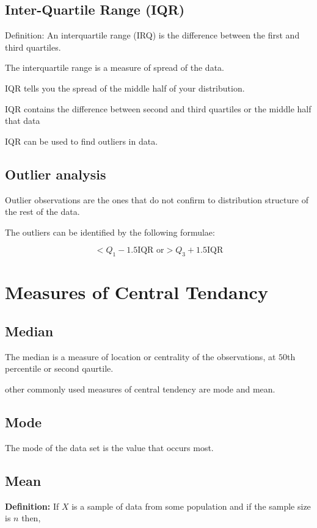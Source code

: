 \documentclass[12pt]{article}
\begin{document}
\subsection{Inter-Quartile Range (IQR)}
Definition: An interquartile range (IRQ) is the difference between the first and third quartiles.

The interquartile range is a measure of spread of the data.

IQR tells you the spread of the middle half of your distribution.

IQR contains the {difference between} second and third quartiles  or the middle half that data

IQR can be used to find outliers in data.

\subsection{Outlier analysis}

Outlier observations are the ones that do not confirm to distribution structure of the rest of the data.

The outliers can be identified by the following formulae:

\begin{equation}
    < Q_1 - 1.5\text{IQR or} > Q_3 + 1.5\text{IQR}
\end{equation}


\section{Measures of Central Tendancy}

\subsection{Median}
The median is a measure of location or centrality of the observations, at $50$th percentile or second qaurtile.

other commonly used measures of central tendency are mode and mean.
\subsection{Mode}
The mode of the data set is the value that occurs most.
\subsection{Mean}

\textbf{Definition: }If $X$ is a sample of data from some population and if the sample size is $n$ then,
\end{document}
